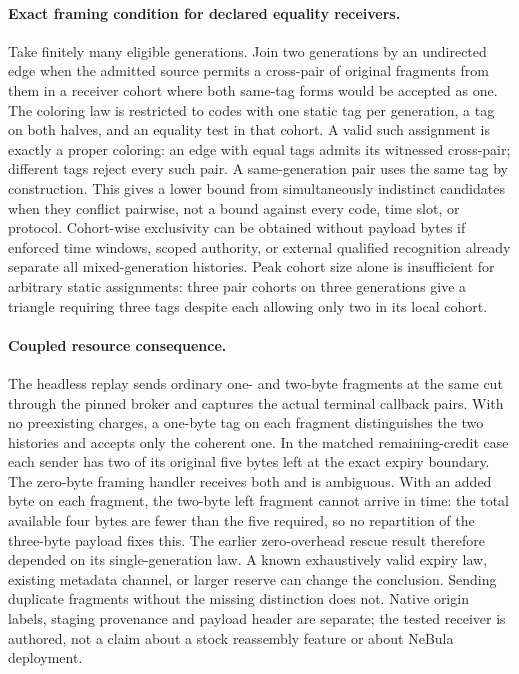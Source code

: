 \documentclass{article}
\begin{document}
\paragraph{Exact framing condition for declared equality receivers.}
Take finitely many eligible generations. Join two generations by an
undirected edge when the admitted source permits a cross-pair of original
fragments from them in a receiver cohort where both same-tag forms would
be accepted as one. The coloring law is restricted to codes with one
static tag per generation, a tag on both halves, and an equality test in
that cohort. A valid such assignment is exactly a proper coloring:
an edge with equal tags admits its witnessed cross-pair; different tags
reject every such pair. A same-generation pair uses the same tag by
construction. This gives a lower bound from simultaneously indistinct
candidates when they conflict pairwise, not a bound against every code,
time slot, or protocol. Cohort-wise exclusivity can be obtained without
payload bytes if enforced time windows, scoped authority, or external
qualified recognition already separate all mixed-generation histories.
Peak cohort size alone is insufficient for arbitrary static assignments:
three pair cohorts on three generations give a triangle requiring three
tags despite each allowing only two in its local cohort.

\paragraph{Coupled resource consequence.}
The headless replay sends ordinary one- and two-byte fragments at the same
cut through the pinned broker and captures the actual terminal callback
pairs. With no preexisting charges, a one-byte tag on each fragment
distinguishes the two histories and accepts only the coherent one. In the
matched remaining-credit case each sender has two of its original five
bytes left at the exact expiry boundary. The zero-byte framing handler
receives both and is ambiguous. With an added byte on each fragment, the
two-byte left fragment cannot arrive in time: the total available four
bytes are fewer than the five required, so no repartition of the
three-byte payload fixes this. The earlier zero-overhead rescue result
therefore depended on its single-generation law. A known exhaustively
valid expiry law, existing metadata channel, or larger reserve can change
the conclusion. Sending duplicate fragments without the missing
distinction does not. Native origin labels, staging provenance and payload
header are separate; the tested receiver is authored, not a claim about
a stock reassembly feature or about NeBula deployment.
\end{document}
